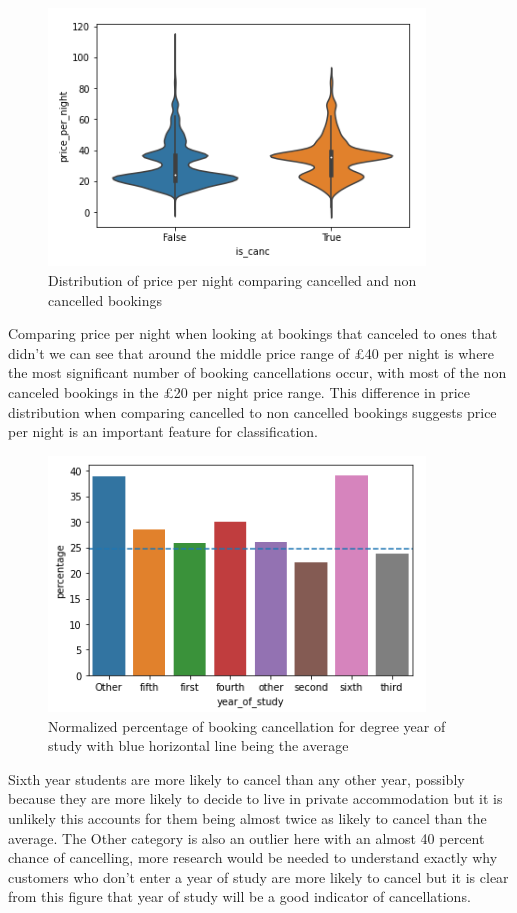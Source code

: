  \begin{figure}[hbt!]
 \includegraphics[width=10cm]{figures/price_per_night.png}
 \caption{Distribution of price per night comparing cancelled and non cancelled bookings}
\end{figure}
 
 
 Comparing price per night when looking at bookings that canceled to ones that didn't we can see that around the middle price range of £40 per night is where the most significant number of booking cancellations occur, with most of the non canceled bookings in the £20 per night price range. This difference in price distribution when comparing cancelled to non cancelled bookings suggests price per night is an important feature for classification. 
 
 \begin{figure}[hbt!]
\includegraphics[width=10cm]{figures/canc_per_year.png}
 \caption{Normalized percentage of booking cancellation for degree year of study with blue horizontal line being the average}
\end{figure}
 
  
Sixth year students are more likely to cancel than any other year, possibly because they are more likely to decide to live in private accommodation but it is unlikely this accounts for them being almost twice as likely to cancel than the average. The Other category is also an outlier here with an almost 40 percent chance of cancelling, more research would be needed to understand exactly why customers who don't enter a year of study are more likely to cancel but it is clear from this figure that year of study will be a good indicator of cancellations.
  
